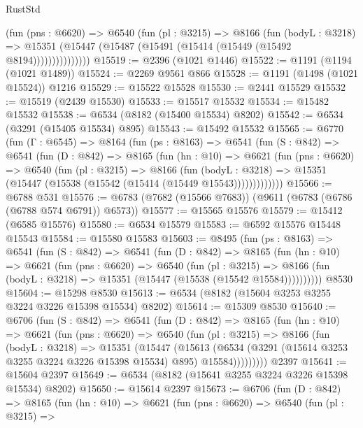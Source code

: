 \begin{lexlean}{RustStd}
\begin{coremodule}
                (fun (pns : @6620) =>
                @6540
                  (fun (pl : @3215) =>
                  @8166
                    (fun (bodyL : @3218) =>
                    @15351 (@15447 (@15487 (@15491 (@15414 (@15449 (@15492 @8194)))))))))))))))
@15519 := @2396 (@1021 @1446)
@15522 := @1191 (@1194 (@1021 @1489))
@15524 := @2269 @9561 @866
@15528 := @1191 (@1498 (@1021 @15524)) @1216
@15529 := @15522 @15528
@15530 := @2441 @15529
@15532 := @15519 (@2439 @15530)
@15533 := @15517 @15532
@15534 := @15482 @15532
@15538 := @6534 (@8182 (@15400 @15534) @8202)
@15542 := @6534 (@3291 (@15405 @15534) @895)
@15543 := @15492 @15532
@15565 := @6770
    (fun (Γ : @6545) =>
    @8164
      (fun (ps : @8163) =>
      @6541
        (fun (S : @842) =>
        @6541
          (fun (D : @842) =>
          @8165
            (fun (hn : @10) =>
            @6621
              (fun (pns : @6620) =>
              @6540
                (fun (pl : @3215) =>
                @8166
                  (fun (bodyL : @3218) =>
                  @15351 (@15447 (@15538 (@15542 (@15414 (@15449 @15543)))))))))))))
@15566 := @6788 @531
@15576 := @6783 (@7682 (@15566 @7683)) (@9611 (@6783 (@6786 (@6788 @574 @6791)) @6573))
@15577 := @15565 @15576
@15579 := @15412 (@6585 @15576)
@15580 := @6534 @15579
@15583 := @6592 @15576 @15448 @15543
@15584 := @15580 @15583
@15603 := @8495
    (fun (ps : @8163) =>
    @6541
      (fun (S : @842) =>
      @6541
        (fun (D : @842) =>
        @8165
          (fun (hn : @10) =>
          @6621
            (fun (pns : @6620) =>
            @6540
              (fun (pl : @3215) =>
              @8166 (fun (bodyL : @3218) => @15351 (@15447 (@15538 (@15542 @15584))))))))))
    @8530
@15604 := @15298 @8530
@15613 := @6534 (@8182 (@15604 @3253 @3255 @3224 @3226 @15398 @15534) @8202)
@15614 := @15309 @8530
@15640 := @6706
    (fun (S : @842) =>
    @6541
      (fun (D : @842) =>
      @8165
        (fun (hn : @10) =>
        @6621
          (fun (pns : @6620) =>
          @6540
            (fun (pl : @3215) =>
            @8166
              (fun (bodyL : @3218) =>
              @15351
                (@15447
                  (@15613
                    (@6534
                      (@3291 (@15614 @3253 @3255 @3224 @3226 @15398 @15534) @895)
                      @15584)))))))))
    @2397
@15641 := @15604 @2397
@15649 := @6534 (@8182 (@15641 @3255 @3224 @3226 @15398 @15534) @8202)
@15650 := @15614 @2397
@15673 := @6706
    (fun (D : @842) =>
    @8165
      (fun (hn : @10) =>
      @6621
        (fun (pns : @6620) =>
        @6540
          (fun (pl : @3215) =>

\end{coremodule}
\end{lexlean}
